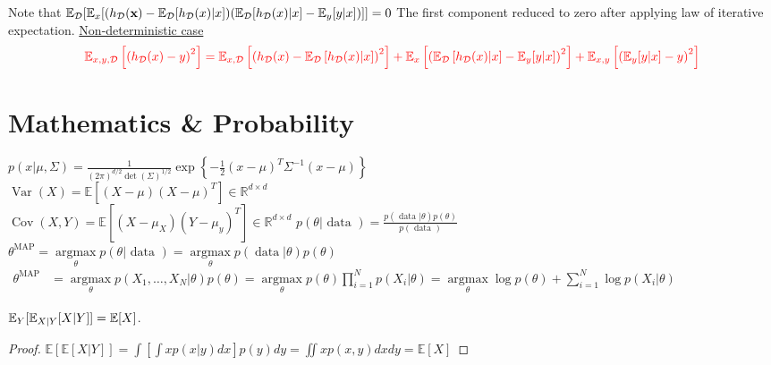 \documentclass[4pt]{article}
\begin{document}
	Note that
	$
		\mathbb{E}_{\mathcal{{D}}}[
		\mathbb{E}_x[
		(h_{\mathcal{{D}}}(\textbf{x}) - \mathbb{E}_{\mathcal{{D}}}[h_{\mathcal{{D}}}(x)|x])
		(\mathbb{E}_{\mathcal{{D}}}[h_{\mathcal{{D}}}(x)|x] -  \mathbb{E}_y[y|x])
		]] = 0
	$
	The first component reduced to zero after applying law of iterative expectation. \ul{Non-deterministic case}
	\begin{align}
		\textcolor{red}{\mathbb{E}_{x, y, \mathcal{D}}\left[\left(h_{\mathcal{D}}(x)-y\right)^{2}\right]=\mathbb{E}_{x, \mathcal{D}}\left[\left(h_{\mathcal{D}}(x)-\mathbb{E}_{\mathcal{D}}\left[h_{\mathcal{D}}(x) | x\right]\right)^{2}\right]+\mathbb{E}_{x}\left[\left(\mathbb{E}_{\mathcal{D}}\left[h_{\mathcal{D}}(x) | x\right]-\mathbb{E}_{y}[y | x]\right)^{2}\right]+\mathbb{E}_{x, y}\left[\left(\mathbb{E}_{y}[y | x]-y\right)^{2}\right]}
	\end{align}
	
	\section{Mathematics \& Probability}
	$p(x | \mu, \Sigma)=\frac{1}{(2 \pi)^{d / 2} \operatorname{det}(\Sigma)^{1 / 2}} \exp \left\{-\frac{1}{2}(x-\mu)^{T} \Sigma^{-1}(x-\mu)\right\}$ \\
	$\operatorname{Var}(X)=\mathbb{E}\left[(X-\mu)(X-\mu)^{T}\right] \in \mathbb{R}^{d \times d}$ \\
	$\operatorname{Cov}(X, Y)=\mathbb{E}\left[\left(X-\mu_{X}\right)\left(Y-\mu_{y}\right)^{T}\right] \in \mathbb{R}^{d \times d}$ \quad $p(\theta | \text { data })=\frac{p(\text { data } | \theta) p(\theta)}{p(\text { data })}$ \quad $\theta^{\mathrm{MAP}}=\underset{\theta}{\operatorname{argmax}} p(\theta | \text { data })=\underset{\theta}{\operatorname{argmax}} p(\operatorname{data} | \theta) p(\theta)$ \\
	$\begin{aligned}\theta^{\mathrm{MAP}} &=\underset{\theta}{\operatorname{argmax}} p\left(X_{1}, \ldots, X_{N} | \theta\right) p(\theta)=\underset{\theta}{\operatorname{argmax}} p(\theta) \prod_{i=1}^{N} p\left(X_{i} | \theta\right) =\underset{\theta}{\operatorname{argmax}} \log p(\theta)+\sum_{i=1}^{N} \log p\left(X_{i} | \theta\right) \end{aligned}$
	\begin{proposition}
	$\mathbb{E}_Y [\mathbb{E}_{X|Y}[X|Y]] = \mathbb{E}[{X}]$.
		\begin{proof}
			$\mathbb{E}[\mathbb{E}[X | Y]]=\int\left[\int x p(x | y) d x\right] p(y) d y=\iint x p(x, y) d x d y=\mathbb{E}[X]$
		\end{proof}
	\end{proposition}
\end{document}
